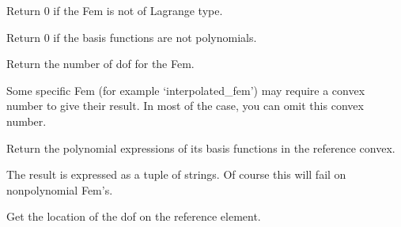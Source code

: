 \documentclass[a4paper,11pt,english]{sphinxmanual}
\begin{document}
\begin{fulllineitems}
\begin{fulllineitems}
\label{\detokenize{python/cmdref_Fem:getfem.Fem.is_lagrange}}
Return 0 if the Fem is not of Lagrange type.

\end{fulllineitems}


\begin{fulllineitems}
\label{\detokenize{python/cmdref_Fem:getfem.Fem.is_polynomial}}
Return 0 if the basis functions are not polynomials.

\end{fulllineitems}


\begin{fulllineitems}
\label{\detokenize{python/cmdref_Fem:getfem.Fem.nbdof}}
Return the number of dof for the Fem.

Some specific Fem (for example ‘interpolated\_fem’) may require a
convex number  to give their result. In most of the case, you
can omit this convex number.

\end{fulllineitems}


\begin{fulllineitems}
\label{\detokenize{python/cmdref_Fem:getfem.Fem.poly_str}}
Return the polynomial expressions of its basis functions in
the reference convex.

The result is expressed as a tuple of
strings. Of course this will fail on non\sphinxhyphen{}polynomial Fem’s.

\end{fulllineitems}


\begin{fulllineitems}
\label{\detokenize{python/cmdref_Fem:getfem.Fem.pts}}
Get the location of the dof on the reference element.


\end{fulllineitems}
\end{fulllineitems}
\end{document}
